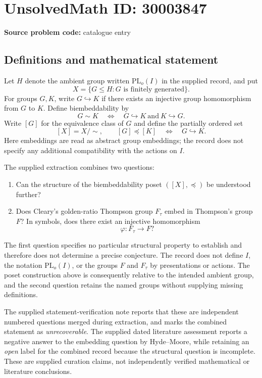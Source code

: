 \documentclass[11pt]{article}
\begin{document}
\section*{UnsolvedMath ID: 30003847}
\textbf{Source problem code:} catalogue entry
\subsection{Definitions and mathematical statement}
Let \(H\) denote the ambient group written \(\mathrm{PL}_{o}(I)\) in the supplied record, and put
\[
X=\{G\leq H: G\text{ is finitely generated}\}.
\]
For groups \(G,K\), write \(G\hookrightarrow K\) if there exists an injective group homomorphism from \(G\) to \(K\). Define biembeddability by
\[
G\sim K\quad\Longleftrightarrow\quad G\hookrightarrow K\ \text{and}\ K\hookrightarrow G.
\]
Write \([G]\) for the equivalence class of \(G\) and define the partially ordered set
\[
[X]=X/{\sim},\qquad [G]\preceq[K]\quad\Longleftrightarrow\quad G\hookrightarrow K.
\]
Here embeddings are read as abstract group embeddings; the record does not specify any additional compatibility with the actions on \(I\).

The supplied extraction combines two questions:
\begin{enumerate}
\item Can the structure of the biembeddability poset \(([X],\preceq)\) be understood further?
\item Does Cleary's golden-ratio Thompson group \(F_{\tau}\) embed in Thompson's group \(F\)? In symbols, does there exist an injective homomorphism
\[
\varphi:F_{\tau}\longrightarrow F?
\]
\end{enumerate}
The first question specifies no particular structural property to establish and therefore does not determine a precise conjecture. The record does not define \(I\), the notation \(\mathrm{PL}_{o}(I)\), or the groups \(F\) and \(F_{\tau}\) by presentations or actions. The poset construction above is consequently relative to the intended ambient group, and the second question retains the named groups without supplying missing definitions.

The supplied statement-verification note reports that these are independent numbered questions merged during extraction, and marks the combined statement as \emph{unrecoverable}. The supplied dated literature assessment reports a negative answer to the embedding question by Hyde--Moore, while retaining an \emph{open} label for the combined record because the structural question is incomplete. These are supplied curation claims, not independently verified mathematical or literature conclusions.
\end{document}
